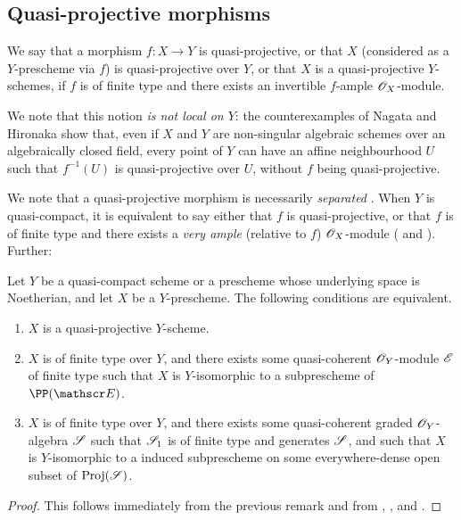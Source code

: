 \subsection{Quasi-projective morphisms}
\label{subsection:quasi-projective-morphisms}

\begin{defn}[5.3.1]
\label{2.5.3.1}
We say that a morphism $f:X\to Y$ is quasi-projective, or that $X$ (considered as a $Y$-prescheme via $f$) is quasi-projective over $Y$, or that $X$ is a quasi-projective $Y$-schemes, if $f$ is of finite type and there exists an invertible $f$-ample $\mathscr{O}_X$-module.
\end{defn}

We note that this notion \emph{is not local on $Y$}:
the counterexamples of Nagata \cite{II-26} and Hironaka show that, even if $X$ and $Y$ are non-singular algebraic schemes over an algebraically closed field, every point of $Y$ can have an affine neighbourhood $U$ such that $f^{-1}(U)$ is quasi-projective over $U$, without $f$ being quasi-projective.

We note that a quasi-projective morphism is necessarily \emph{separated} .
When $Y$ is quasi-compact, it is equivalent to say either that $f$ is quasi-projective, or that $f$ is of finite type and there exists a \emph{very ample} (relative to $f$) $\mathscr{O}_X$-module ( and ).
Further:

\begin{prop}[5.3.2]
\label{2.5.3.2}
Let $Y$ be a quasi-compact scheme or a prescheme whose underlying space is Noetherian, and let $X$ be a $Y$-prescheme.
The following conditions are equivalent.
\begin{enumerate}[label=\emph{(\alph*)}]
    \item $X$ is a quasi-projective $Y$-scheme.
    \item $X$ is of finite type over $Y$, and there exists some quasi-coherent $\mathscr{O}_Y$-module $\mathscr{E}$ of finite type such that $X$ is $Y$-isomorphic to a subprescheme of $\PP(\sh{E})$.
    \item $X$ is of finite type over $Y$, and there exists some quasi-coherent graded $\mathscr{O}_Y$-algebra $\mathscr{S}$ such that $\mathscr{S}_1$ is of finite type and generates $\mathscr{S}$, and such that $X$ is $Y$-isomorphic to a induced subprescheme on some everywhere-dense open subset of ${\mathop{\mathrm{Proj}}\nolimits}(\mathscr{S})$.
\end{enumerate}
\end{prop}

\begin{proof}
\label{proof-2.5.3.2}
This follows immediately from the previous remark and from , , and .
\end{proof}

